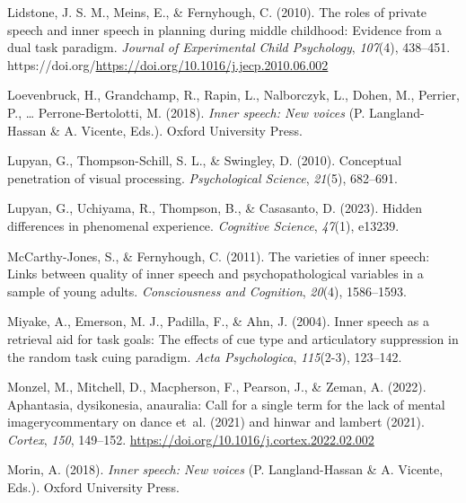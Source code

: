 \documentclass[
  man,a4paper,floatsintext]{apa6}
\newlength{\cslhangindent}
\newlength{\cslentryspacingunit} %
\newenvironment{CSLReferences}[2] %
 {%
  \setlength{\parindent}{0pt}
  \ifodd #1
  \let\oldpar\par
  \def\par{\hangindent=\cslhangindent\oldpar}
  \fi
  \setlength{\parskip}{#2\cslentryspacingunit}
 }%
 {}
\begin{document}
\begin{CSLReferences}{1}{0}
\leavevmode{}%
Lidstone, J. S. M., Meins, E., \& Fernyhough, C. (2010). The roles of private speech and inner speech in planning during middle childhood: Evidence from a dual task paradigm. \emph{Journal of Experimental Child Psychology}, \emph{107}(4), 438--451. https://doi.org/\url{https://doi.org/10.1016/j.jecp.2010.06.002}

\leavevmode{}%
Loevenbruck, H., Grandchamp, R., Rapin, L., Nalborczyk, L., Dohen, M., Perrier, P., \ldots{} Perrone-Bertolotti, M. (2018). \emph{Inner speech: New voices} (P. Langland-Hassan \& A. Vicente, Eds.). Oxford University Press.

\leavevmode{}%
Lupyan, G., Thompson-Schill, S. L., \& Swingley, D. (2010). Conceptual penetration of visual processing. \emph{Psychological Science}, \emph{21}(5), 682--691.

\leavevmode{}%
Lupyan, G., Uchiyama, R., Thompson, B., \& Casasanto, D. (2023). Hidden differences in phenomenal experience. \emph{Cognitive Science}, \emph{47}(1), e13239.

\leavevmode{}%
McCarthy-Jones, S., \& Fernyhough, C. (2011). The varieties of inner speech: Links between quality of inner speech and psychopathological variables in a sample of young adults. \emph{Consciousness and Cognition}, \emph{20}(4), 1586--1593.

\leavevmode{}%
Miyake, A., Emerson, M. J., Padilla, F., \& Ahn, J. (2004). Inner speech as a retrieval aid for task goals: The effects of cue type and articulatory suppression in the random task cuing paradigm. \emph{Acta Psychologica}, \emph{115}(2-3), 123--142.

\leavevmode{}%
Monzel, M., Mitchell, D., Macpherson, F., Pearson, J., \& Zeman, A. (2022). Aphantasia, dysikonesia, anauralia: Call for a single term for the lack of mental imagery{\textendash}commentary on dance et~al. (2021) and hinwar and lambert (2021). \emph{Cortex}, \emph{150}, 149--152. \url{https://doi.org/10.1016/j.cortex.2022.02.002}

\leavevmode{}%
Morin, A. (2018). \emph{Inner speech: New voices} (P. Langland-Hassan \& A. Vicente, Eds.). Oxford University Press.


\end{CSLReferences}
\end{document}
